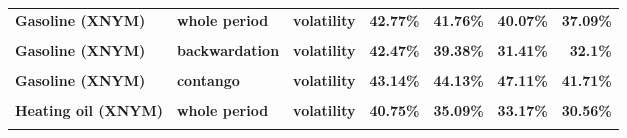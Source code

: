 \documentclass[
  authoryear,
  preprint,
  3p]{elsarticle}
\begin{document}
\begin{longtable}[t]{>{}l>{}l>{}l>{}r>{}r>{}r>{}r}
\textbf{Gasoline (XNYM)} & \textbf{whole period} & \textbf{volatility} & \textcolor[HTML]{4285f4}{\textbf{42.77\%}} & \textcolor[HTML]{4285f4}{\textbf{41.76\%}} & \textcolor[HTML]{4285f4}{\textbf{40.07\%}} & \textcolor[HTML]{4285f4}{\textbf{37.09\%}}\\
\textbf{\cellcolor{gray!10}{Gasoline (XNYM)}} & \textbf{\cellcolor{gray!10}{backwardation}} & \textbf{\cellcolor{gray!10}{mean}} & \textcolor[HTML]{4285f4}{\textbf{\cellcolor{gray!10}{39\%}}} & \textcolor[HTML]{4285f4}{\textbf{\cellcolor{gray!10}{19.82\%}}} & \textcolor[HTML]{4285f4}{\textbf{\cellcolor{gray!10}{23.98\%}}} & \textcolor[HTML]{4285f4}{\textbf{\cellcolor{gray!10}{9.69\%}}}\\
\addlinespace
\textbf{Gasoline (XNYM)} & \textbf{backwardation} & \textbf{volatility} & \textcolor[HTML]{4285f4}{\textbf{42.47\%}} & \textcolor[HTML]{4285f4}{\textbf{39.38\%}} & \textcolor[HTML]{4285f4}{\textbf{31.41\%}} & \textcolor[HTML]{4285f4}{\textbf{32.1\%}}\\
\textbf{\cellcolor{gray!10}{Gasoline (XNYM)}} & \textbf{\cellcolor{gray!10}{contango}} & \textbf{\cellcolor{gray!10}{mean}} & \textcolor[HTML]{4285f4}{\textbf{\cellcolor{gray!10}{-5.22\%}}} & \textcolor[HTML]{4285f4}{\textbf{\cellcolor{gray!10}{42.13\%}}} & \textcolor[HTML]{4285f4}{\textbf{\cellcolor{gray!10}{-0.09\%}}} & \textcolor[HTML]{4285f4}{\textbf{\cellcolor{gray!10}{-19.47\%}}}\\
\textbf{Gasoline (XNYM)} & \textbf{contango} & \textbf{volatility} & \textcolor[HTML]{4285f4}{\textbf{43.14\%}} & \textcolor[HTML]{4285f4}{\textbf{44.13\%}} & \textcolor[HTML]{4285f4}{\textbf{47.11\%}} & \textcolor[HTML]{4285f4}{\textbf{41.71\%}}\\
\textbf{\cellcolor{gray!10}{Heating oil (XNYM)}} & \textbf{\cellcolor{gray!10}{whole period}} & \textbf{\cellcolor{gray!10}{mean}} & \textcolor[HTML]{4285f4}{\textbf{\cellcolor{gray!10}{16.31\%}}} & \textcolor[HTML]{4285f4}{\textbf{\cellcolor{gray!10}{*29.88\%}}} & \textcolor[HTML]{4285f4}{\textbf{\cellcolor{gray!10}{6.83\%}}} & \textcolor[HTML]{4285f4}{\textbf{\cellcolor{gray!10}{-3.44\%}}}\\
\textbf{Heating oil (XNYM)} & \textbf{whole period} & \textbf{volatility} & \textcolor[HTML]{4285f4}{\textbf{40.75\%}} & \textcolor[HTML]{4285f4}{\textbf{35.09\%}} & \textcolor[HTML]{4285f4}{\textbf{33.17\%}} & \textcolor[HTML]{4285f4}{\textbf{30.56\%}}\\
\addlinespace
\textbf{\cellcolor{gray!10}{Heating oil (XNYM)}} & \textbf{\cellcolor{gray!10}{backwardation}} & \textbf{\cellcolor{gray!10}{mean}} & \textcolor[HTML]{4285f4}{\textbf{\cellcolor{gray!10}{36.32\%}}} & \textcolor[HTML]{4285f4}{\textbf{\cellcolor{gray!10}{29.41\%}}} & \textcolor[HTML]{4285f4}{\textbf{\cellcolor{gray!10}{25.56\%}}} & \textcolor[HTML]{4285f4}{\textbf{\cellcolor{gray!10}{15.16\%}}}\\

\end{longtable}
\end{document}
